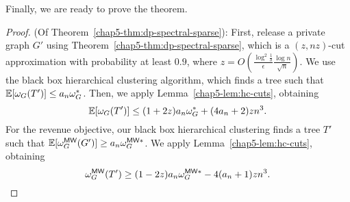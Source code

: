 Finally, we are ready to prove the theorem.
\begin{proof} (Of Theorem~\ref{chap5-thm:dp-spectral-sparse}): 
    First, release a private graph $G'$ using Theorem~\ref{chap5-thm:dp-spectral-sparse}, which is a $(z, nz)$-cut approximation with probability at least $0.9$, where $z = O(\frac{\log^2 \frac{1}{\delta}}{\epsilon}\frac{\log n}{\sqrt{n}})$. We use the black box hierarchical clustering algorithm, which finds a tree such that $\operatorname{\mathbb{E}}[\omega_G(T')] \leq a_n \omega_G^*$. Then, we apply Lemma~\ref{chap5-lem:hc-cuts}, obtaining
    \[
        \operatorname{\mathbb{E}}[\omega_G(T')] \leq (1+2z) a_n \omega_G^* + (4a_n + 2) z n^3.
    \]
    For the revenue objective, our black box hierarchical clustering finds a tree $T'$ such that $\operatorname{\mathbb{E}}[\omega_G^{\textsf{MW}}(G')] \geq a_n \omega_G^{\textsf{MW}*}$. We apply Lemma~\ref{chap5-lem:hc-cuts}, obtaining
    \[
        \omega_G^{\textsf{MW}}(T') \geq (1-2z) a_n \omega_{G}^{\textsf{MW}*} - 4(a_n+1)z n^3.
    \]
\end{proof}

